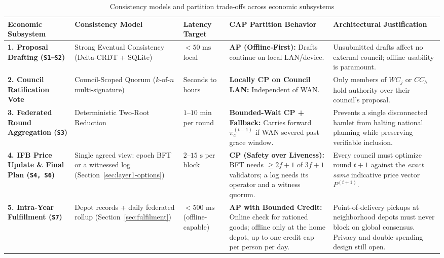 \documentclass[10pt,twoside,openany]{book}
\theoremstyle{dpepstyle}
\begin{document}
\begin{table}[htbp]
\centering
\caption{Consistency models and partition trade-offs across economic subsystems}
\label{tab:consistency}
\scriptsize
\setlength{\tabcolsep}{3.5pt}
\begin{tabularx}{\textwidth}{L{0.95in} L{1.00in} C{0.62in} L{1.00in} Y}
\toprule
\textbf{Economic Subsystem} & \textbf{Consistency Model} & \textbf{Latency Target} & \textbf{CAP Partition Behavior} & \textbf{Architectural Justification} \\
\midrule
\textbf{1. Proposal Drafting (\texttt{S1--S2})} & Strong Eventual Consistency (Delta-CRDT + SQLite)\footnotemark & $<50\text{ ms}$ local & \textbf{AP (Offline-First):} Drafts continue on local LAN/device. & Unsubmitted drafts affect no external council; offline usability is paramount. \\
\addlinespace[3pt]
\textbf{2. Council Ratification Vote} & Council-Scoped Quorum ($k$-of-$n$ multi-signature) & Seconds to hours & \textbf{Locally CP on Council LAN:} Independent of WAN. & Only members of $WC_j$ or $CC_h$ hold authority over their council's proposal. \\
\addlinespace[3pt]
\textbf{3. Federated Round Aggregation (\texttt{S3})} & Deterministic Two-Root Reduction & $1\text{--}10\text{ min}$ per round & \textbf{Bounded-Wait CP + Fallback:} Carries forward $\pi_c^{(t-1)}$ if WAN severed past grace window. & Prevents a single disconnected hamlet from halting national planning while preserving verifiable inclusion. \\
\addlinespace[3pt]
\textbf{4. IFB Price Update \& Final Plan (\texttt{S4, S6})} & Single agreed view: epoch BFT\footnotemark{} or a witnessed log (Section~\ref{sec:layer1-options}) & $2\text{--}15\text{ s}$ per block & \textbf{CP (Safety over Liveness):} BFT needs $\ge 2f+1$ of $3f+1$ validators; a log needs its operator and a witness quorum. & Every council must optimize round $t+1$ against the \emph{exact same} indicative price vector $P^{(t+1)}$. \\
\addlinespace[3pt]
\textbf{5. Intra-Year Fulfillment (\texttt{S7})} & Depot records + daily federated rollup (Section~\ref{sec:fulfilment}) & $<500\text{ ms}$ (offline-capable) & \textbf{AP with Bounded Credit:} Online check for rationed goods; offline only at the home depot, up to one credit cap per person per day. & Point-of-delivery pickups at neighborhood depots must never block on global consensus. Privacy and double-spending design still open. \\
\bottomrule
\end{tabularx}
\end{table}
\addtocounter{footnote}{-1}
\end{document}
